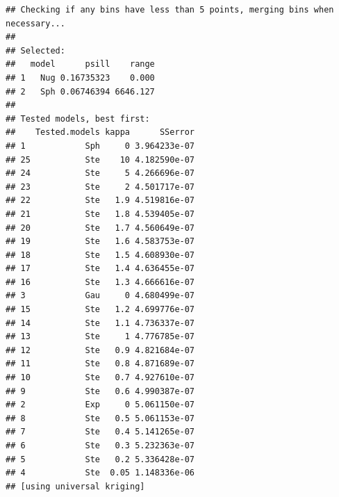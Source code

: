 \documentclass[10pt,b5paper,]{book}
\newenvironment{Shaded}{\begin{snugshade}}{\end{snugshade}}
\newcommand{\CommentTok}[1]{\textcolor[rgb]{0.56,0.35,0.01}{\textit{#1}}}
\newcommand{\KeywordTok}[1]{\textcolor[rgb]{0.13,0.29,0.53}{\textbf{#1}}}
\newcommand{\NormalTok}[1]{#1}
\newcommand{\OperatorTok}[1]{\textcolor[rgb]{0.81,0.36,0.00}{\textbf{#1}}}
\newcommand{\StringTok}[1]{\textcolor[rgb]{0.31,0.60,0.02}{#1}}
\theoremstyle{definition}
\theoremstyle{definition}
\theoremstyle{definition}
\theoremstyle{remark}
\begin{document}
\begin{Shaded}
\end{Shaded}

 

\begin{verbatim}
## Checking if any bins have less than 5 points, merging bins when necessary...
## 
## Selected:
##   model      psill    range
## 1   Nug 0.16735323    0.000
## 2   Sph 0.06746394 6646.127
## 
## Tested models, best first:
##    Tested.models kappa      SSerror
## 1            Sph     0 3.964233e-07
## 25           Ste    10 4.182590e-07
## 24           Ste     5 4.266696e-07
## 23           Ste     2 4.501717e-07
## 22           Ste   1.9 4.519816e-07
## 21           Ste   1.8 4.539405e-07
## 20           Ste   1.7 4.560649e-07
## 19           Ste   1.6 4.583753e-07
## 18           Ste   1.5 4.608930e-07
## 17           Ste   1.4 4.636455e-07
## 16           Ste   1.3 4.666616e-07
## 3            Gau     0 4.680499e-07
## 15           Ste   1.2 4.699776e-07
## 14           Ste   1.1 4.736337e-07
## 13           Ste     1 4.776785e-07
## 12           Ste   0.9 4.821684e-07
## 11           Ste   0.8 4.871689e-07
## 10           Ste   0.7 4.927610e-07
## 9            Ste   0.6 4.990387e-07
## 2            Exp     0 5.061150e-07
## 8            Ste   0.5 5.061153e-07
## 7            Ste   0.4 5.141265e-07
## 6            Ste   0.3 5.232363e-07
## 5            Ste   0.2 5.336428e-07
## 4            Ste  0.05 1.148336e-06
## [using universal kriging]
\end{verbatim}
\end{document}

